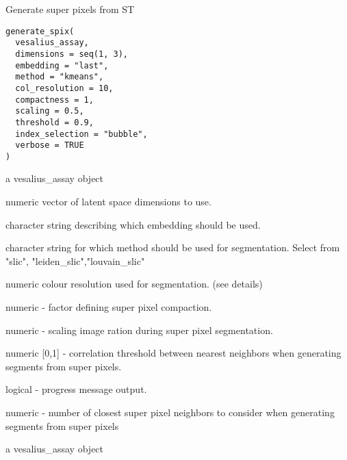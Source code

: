 \documentclass[a4paper]{book}
\begin{document}
%
\begin{Description}
Generate super pixels from ST
\end{Description}
%
\begin{Usage}
\begin{verbatim}
generate_spix(
  vesalius_assay,
  dimensions = seq(1, 3),
  embedding = "last",
  method = "kmeans",
  col_resolution = 10,
  compactness = 1,
  scaling = 0.5,
  threshold = 0.9,
  index_selection = "bubble",
  verbose = TRUE
)
\end{verbatim}
\end{Usage}
%
\begin{Arguments}
\begin{ldescription}
\item[\code{vesalius\_assay}] a vesalius\_assay object

\item[\code{dimensions}] numeric vector of latent space dimensions to use.

\item[\code{embedding}] character string describing which embedding should
be used.

\item[\code{method}] character string for which method should be used for
segmentation. Select from "slic", 
"leiden\_slic","louvain\_slic"

\item[\code{col\_resolution}] numeric colour resolution used for segmentation. 
(see details)

\item[\code{compactness}] numeric - factor defining super pixel compaction.

\item[\code{scaling}] numeric - scaling image ration during super pixel 
segmentation.

\item[\code{threshold}] numeric [0,1] - correlation threshold between 
nearest neighbors when generating segments from super pixels.

\item[\code{verbose}] logical - progress message output.

\item[\code{k}] numeric - number of closest super pixel neighbors to consider
when generating segments from super pixels
\end{ldescription}
\end{Arguments}
%
\begin{Value}
a vesalius\_assay object
\end{Value}
\end{document}
